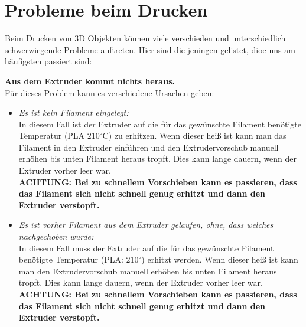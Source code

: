 \documentclass[11pt,a4paper]{scrartcl}
\begin{document}
\section{Probleme beim Drucken}

Beim Drucken von 3D Objekten können viele verschieden und unterschiedlich schwerwiegende Probleme auftreten. Hier sind die jeningen gelistet, dioe uns am häufigsten passiert sind:\\
\begin{description}
\item \textbf{Aus dem Extruder kommt nichts heraus.}\\
Für dieses Problem kann es verschiedene Ursachen geben:
\begin{itemize}
\item \textit{Es ist kein Filament eingelegt:}\\
In diesem Fall ist der Extruder auf die für das gewünschte Filament benötigte Temperatur (PLA $210^\circ$C) zu erhitzen. Wenn dieser heiß ist kann man das Filament in den Extruder einführen und den Extrudervorschub manuell erhöhen bis unten Filament heraus tropft. Dies kann lange dauern, wenn der Extruder vorher leer war.\\
\textbf{ACHTUNG: Bei zu schnellem Vorschieben kann es passieren, dass das Filament sich nicht schnell genug erhitzt und dann den Extruder verstopft.}

\item \textit{Es ist vorher Filament aus dem Extruder gelaufen, ohne, dass welches nachgechoben wurde:}\\
In diesem Fall muss der Extruder auf die für das gewünschte Filament benötigte Temperatur (PLA: $210^\circ$) erhitzt werden. Wenn dieser heiß ist kann man den Extrudervorschub manuell erhöhen bis unten Filament heraus tropft. Dies kann lange dauern, wenn der Extruder vorher leer war.\\
\textbf{ACHTUNG: Bei zu schnellem Vorschieben kann es passieren, dass das Filament sich nicht schnell genug erhitzt und dann den Extruder verstopft.}
\end{itemize}
\vspace{10pt}


\end{description}
\end{document}
